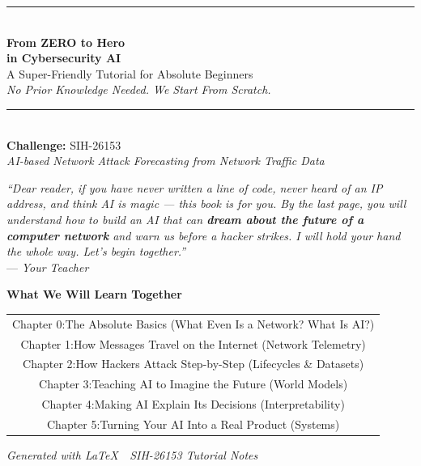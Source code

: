 \documentclass[11pt,a4paper]{article}
\begin{document}
\begin{titlepage}
\centering
\vspace*{0.6cm}
{\color{accent}\rule{\textwidth}{2pt}}\\[0.5cm]
{\Huge\bfseries\color{primary}
From ZERO to Hero}\\[0.3cm]
{\LARGE\bfseries\color{primary}
in Cybersecurity AI}\\[0.45cm]
{\Large\textcolor{secondary}{A Super-Friendly Tutorial for Absolute Beginners}}\\[0.35cm]
{\large\textcolor{warmgray}{\textit{No Prior Knowledge Needed. We Start From Scratch.}}}\\[0.35cm]
{\color{accent}\rule{\textwidth}{2pt}}\\[0.9cm]

{\Large\textbf{Challenge:} SIH-26153}\\[0.25cm]
{\large\textit{AI-based Network Attack Forecasting from Network Traffic Data}}\\[0.9cm]

\begin{minipage}{0.84\textwidth}
\centering
\small
\emph{``Dear reader, if you have never written a line of code, never heard of
an IP address, and think AI is magic --- this book is for you. By the last
page, you will understand how to build an AI that can \textbf{dream about the
future of a computer network} and warn us before a hacker strikes. I will hold
your hand the whole way. Let's begin together.''}
\\[0.4cm]
--- \emph{Your Teacher}
\end{minipage}

\vfill
{\large\color{primary}\textbf{What We Will Learn Together}}\\[0.4cm]
{\small
\begin{tabular}{@{}c@{}}
\hline
Chapter 0:\quad The Absolute Basics (What Even Is a Network? What Is AI?) \\
Chapter 1:\quad How Messages Travel on the Internet (Network Telemetry) \\
Chapter 2:\quad How Hackers Attack Step-by-Step (Lifecycles \& Datasets) \\
Chapter 3:\quad Teaching AI to Imagine the Future (World Models) \\
Chapter 4:\quad Making AI Explain Its Decisions (Interpretability) \\
Chapter 5:\quad Turning Your AI Into a Real Product (Systems) \\
\hline
\end{tabular}}
\vfill
{\small\textit{Generated with \LaTeX\ \textbullet\ SIH-26153 Tutorial Notes}}
\end{titlepage}
\end{document}
